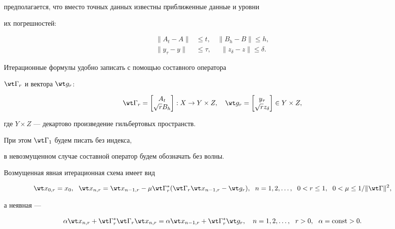 предполагается, что вместо точных данных известны приближенные данные и уровни 


их погрешностей:


\begin{equation}


\begin{split}


\|A_t-A\| &\le t,\quad  \|B_h-B\| \le h,\\


\|y_\tau-y\| &\le \tau, \quad \ \ \|z_\delta-z\| \le \delta.


\end{split}


\end{equation}


Итерационные формулы удобно записать с помощью составного оператора 


$\wt \Gamma_r$ и вектора $\wt g_r$:


$$


\wt \Gamma_r=\begin{bmatrix}A_t \\ \sqrt{r}B_h\end{bmatrix}:X\to Y\times Z,


\quad \wt g_r=\begin{bmatrix}y_\tau\\ \sqrt{r}z_\delta\end{bmatrix}\in Y\times Z,


$$


где $Y\times Z$ --- декартово произведение гильбертовых пространств.


При этом $\wt \Gamma_1$ будем писать без индекса,


в невозмущенном случае составной оператор будем обозначать без волны.


Возмущенная явная итерационная схема имеет вид


\begin{equation}


\wt x_{0,r}=x_0,\ \; 


\wt x_{n,r}=\wt x_{n-1,r}-\mu \wt \Gamma_r^*(\wt\Gamma_r


\wt x_{n-1,r}-\wt g_r),\ \; n=1,2,\dotsc,\ \; 0<r\le 1,\ \; 


0<\mu\le {1}/{\|\wt \Gamma\|^2 },


\end{equation}


а неявная --- 


\begin{equation}


\alpha \wt x_{n,r}+\wt\Gamma_r^*\wt\Gamma_r\wt x_{n,r}=


\alpha \wt x_{n-1,r}+\wt\Gamma_r^*\wt g_r,\quad n=1,2,\dotsc,


\ \ r>0,\ \ \alpha=\const>0.


\end{equation}


